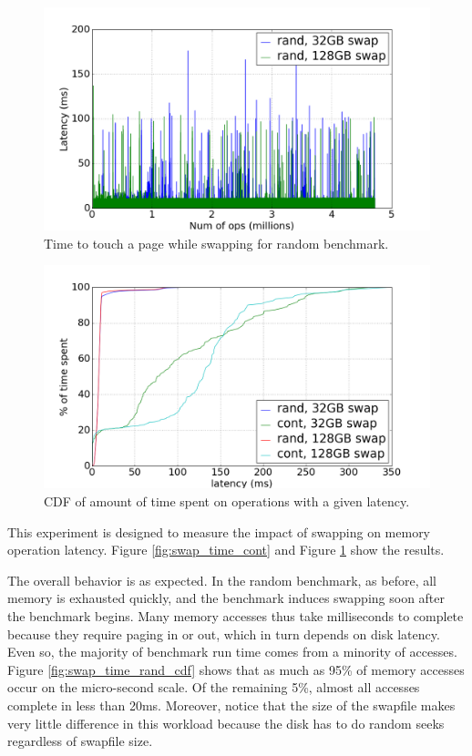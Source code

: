 \documentclass[twocolumn,11pt]{article}
\begin{document}
\begin{figure}
    \includegraphics[width=\columnwidth]{figures/swap_time_rand}
    \caption{Time to touch a page while swapping for random
    benchmark.\label{fig:swap_time_rand}}
\end{figure}

\begin{figure}
    \includegraphics[width=\columnwidth]{figures/swap_time_cdf}
    \caption{CDF of amount of time spent on operations with a given
    latency.\label{fig:swap_time_cdf}}
\end{figure}

This experiment is designed to measure the impact of swapping on memory
operation latency. Figure \ref{fig:swap_time_cont} and Figure
\ref{fig:swap_time_rand} show the results.

The overall behavior is as expected. In the random benchmark, as before, all
memory is exhausted quickly, and the benchmark induces swapping soon after the
benchmark begins. Many memory accesses thus take milliseconds to complete
because they require paging in or out, which in turn depends on disk latency.
Even so, the majority of benchmark run time comes from a minority of accesses.
Figure \ref{fig:swap_time_rand_cdf} shows that as much as 95\% of memory
accesses occur on the micro-second scale. Of the remaining 5\%, almost all
accesses complete in less than 20ms. Moreover, notice that the size of the
swapfile makes very little difference in this workload because the disk has to
do random seeks regardless of swapfile size.
\end{document}
